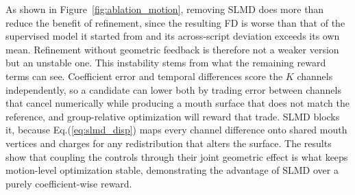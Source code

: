As shown in Figure~\ref{fig:ablation_motion}, removing SLMD does more than reduce the benefit of refinement, since the resulting FD is worse than that of the supervised model it started from and its across-script deviation exceeds its own mean. Refinement without geometric feedback is therefore not a weaker version but an unstable one. This instability stems from what the remaining reward terms can see. Coefficient error and temporal differences score the $K$ channels independently, so a candidate can lower both by trading error between channels that cancel numerically while producing a mouth surface that does not match the reference, and group-relative optimization will reward that trade. SLMD blocks it, because Eq.(\ref{eq:slmd_disp}) maps every channel difference onto shared mouth vertices and charges for any redistribution that alters the surface. The results show that coupling the controls through their joint geometric effect is what keeps motion-level optimization stable, demonstrating the advantage of SLMD over a purely coefficient-wise reward.
